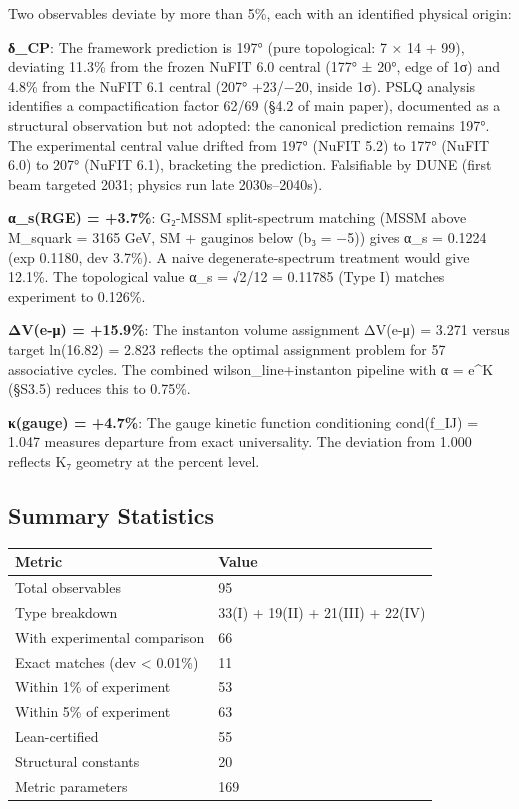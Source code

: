 \documentclass[11pt,a4paper]{article}
\begin{document}
Two observables deviate by more than 5\%, each with an identified physical origin:

\textbf{δ\_\allowbreak{}CP}: The framework prediction is 197° (pure topological: 7 × 14 + 99), deviating 11.3\% from the frozen NuFIT 6.0 central (177° ± 20°, edge of 1σ) and 4.8\% from the NuFIT 6.1 central (207° +23/−20, inside 1σ). PSLQ analysis identifies a compactification factor 62/69 (§4.2 of main paper), documented as a structural observation but not adopted: the canonical prediction remains 197°. The experimental central value drifted from 197° (NuFIT 5.2) to 177° (NuFIT 6.0) to 207° (NuFIT 6.1), bracketing the prediction. Falsifiable by DUNE (first beam targeted 2031; physics run late 2030s--2040s).

\textbf{α\_\allowbreak{}s(RGE) = +3.7\%}: G₂-MSSM split-spectrum matching (MSSM above M\_\allowbreak{}squark = 3165 GeV, SM + gauginos below (b₃ = −5)) gives α\_\allowbreak{}s = 0.1224 (exp 0.1180, dev 3.7\%). A naive degenerate-spectrum treatment would give 12.1\%. The topological value α\_\allowbreak{}s = √2/12 = 0.11785 (Type I) matches experiment to 0.126\%.

\textbf{ΔV(e-μ) = +15.9\%}: The instanton volume assignment ΔV(e-μ) = 3.271 versus target ln(16.82) = 2.823 reflects the optimal assignment problem for 57 associative cycles. The combined wilson\_\allowbreak{}line+instanton pipeline with α = e\^{}K (§S3.5) reduces this to 0.75\%.

\textbf{κ(gauge) = +4.7\%}: The gauge kinetic function conditioning cond(f\_\allowbreak{}IJ) = 1.047 measures departure from exact universality. The deviation from 1.000 reflects K₇ geometry at the percent level.

\subsection{Summary Statistics}\label{summary-statistics}

\begin{longtable}[]{@{}ll@{}}
\toprule\noalign{}
Metric & Value \\
\midrule\noalign{}
\endhead
\bottomrule\noalign{}
\endlastfoot
Total observables & 95 \\
Type breakdown & 33(I) + 19(II) + 21(III) + 22(IV) \\
With experimental comparison & 66 \\
Exact matches (dev \textless{} 0.01\%) & 11 \\
Within 1\% of experiment & 53 \\
Within 5\% of experiment & 63 \\
Lean-certified & 55 \\
Structural constants & 20 \\
Metric parameters & 169 \\
\end{longtable}
\end{document}

